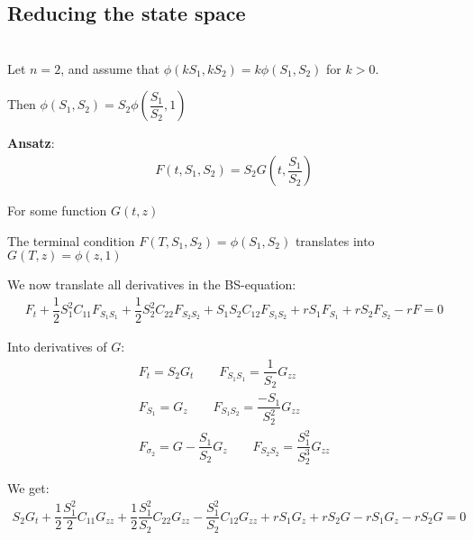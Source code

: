 \subsection{Reducing the state space}\hfill\\
\noindent Let $n=2$, and assume that $\phi(kS_1,kS_2) = k\phi(S_1,S_2)$ for $k>0$.\par
\noindent Then $\phi(S_1,S_2) = S_2\phi\left(\dfrac{S_1}{S_2},1\right)$
\par\bigskip
\noindent\textbf{Ansatz}:
\begin{equation*}
  \begin{gathered}
    F(t,S_1,S_2) = S_2G\left(t,\dfrac{S_1}{S_2}\right)
  \end{gathered}
\end{equation*}\par
\noindent For some function $G(t,z)$
\par\bigskip
\noindent The terminal condition $F(T,S_1,S_2) = \phi(S_1,S_2)$ translates into $G(T,z) = \phi(z,1)$\par
\noindent We now translate all derivatives in the BS-equation:
\begin{equation*}
  \begin{gathered}
    F_t+\dfrac{1}{2}S_1^2C_{11}F_{S_1S_1}+\dfrac{1}{2}S_2^2C_{22}F_{S_2S_2}+S_1S_2C_{12}F_{S_1S_2}+rS_1F_{S_1}+rS_2F_{S_2}-rF=0
  \end{gathered}
\end{equation*}\par
\noindent Into derivatives of $G:$
\begin{equation*}
  \begin{gathered}
    F_t = S_2G_t\qquad F_{S_1S_1} = \dfrac{1}{S_2}G_{zz}\\
    F_{S_1} = G_z\qquad F_{S_1S_2} = \dfrac{-S_1}{S_2^2}G_{zz}\\
    F_{\sigma_2} = G-\dfrac{S_1}{S_2}G_z\qquad F_{S_2S_2} =\dfrac{S_1^2}{S_2^3}G_{zz}
  \end{gathered}
\end{equation*}\par
\noindent We get:
\begin{equation*}
  \begin{gathered}
    S_2G_t+\dfrac{1}{2}\dfrac{S_1^2}{2}C_{11}G_{zz}+\dfrac{1}{2}\dfrac{S_1^2}{S_2}C_{22}G_{zz}-\dfrac{S_1^2}{S_2}C_{12}G_{zz}+rS_1G_z+rS_2G-rS_1G_z-rS_2G=0
  \end{gathered}
\end{equation*}\par
